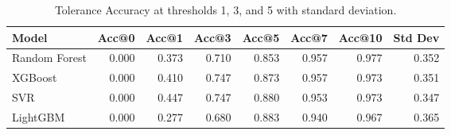 \begin{table}
\caption{Tolerance Accuracy at thresholds 1, 3, and 5 with standard deviation.}
\label{tab:tolerance_std}
\begin{tabular}{lrrrrrrr}
\toprule
Model & Acc@0 & Acc@1 & Acc@3 & Acc@5 & Acc@7 & Acc@10 & Std Dev \\
\midrule
Random Forest & 0.000 & 0.373 & 0.710 & 0.853 & 0.957 & 0.977 & 0.352 \\
XGBoost & 0.000 & 0.410 & 0.747 & 0.873 & 0.957 & 0.973 & 0.351 \\
SVR & 0.000 & 0.447 & 0.747 & 0.880 & 0.953 & 0.973 & 0.347 \\
LightGBM & 0.000 & 0.277 & 0.680 & 0.883 & 0.940 & 0.967 & 0.365 \\
\bottomrule
\end{tabular}
\end{table}
